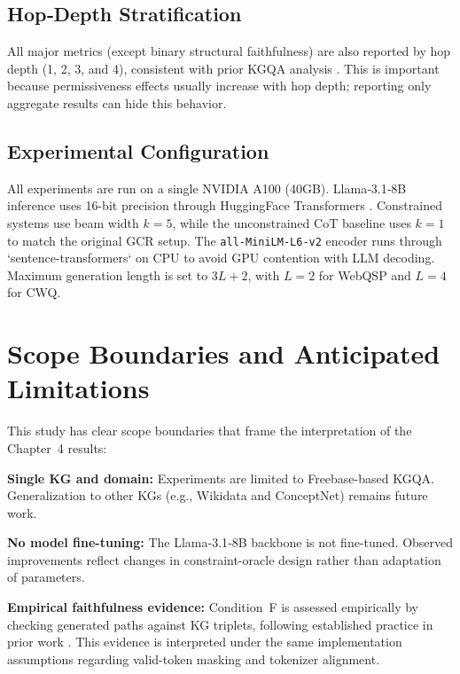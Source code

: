 \subsection{Hop‑Depth Stratification}

All major metrics (except binary structural faithfulness) are also reported by hop depth (1, 2, 3, and 4), consistent with prior KGQA analysis \citep{lan2022survey}. This is important because permissiveness effects usually increase with hop depth; reporting only aggregate results can hide this behavior.

\subsection{Experimental Configuration}

All experiments are run on a single NVIDIA A100 (40GB). Llama‑3.1‑8B inference uses 16-bit precision through HuggingFace Transformers \citep{wolf2020transformers}. Constrained systems use beam width $k=5$, while the unconstrained CoT baseline uses $k=1$ to match the original GCR setup. The \texttt{all-MiniLM-L6-v2} encoder runs through `sentence-transformers` \citep{reimers2019sbert} on CPU to avoid GPU contention with LLM decoding. Maximum generation length is set to $3L+2$, with $L=2$ for WebQSP and $L=4$ for CWQ.

\section{Scope Boundaries and Anticipated Limitations}
\label{sec:ch3limitations}

This study has clear scope boundaries that frame the interpretation of the Chapter~4 results:

\textbf{Single KG and domain:} Experiments are limited to Freebase-based KGQA. Generalization to other KGs (e.g., Wikidata and ConceptNet) remains future work.

\textbf{No model fine-tuning:} The Llama‑3.1‑8B backbone is not fine-tuned. Observed improvements reflect changes in constraint-oracle design rather than adaptation of parameters.

\textbf{Empirical faithfulness evidence:} Condition~F is assessed empirically by checking generated paths against KG triplets, following established practice in prior work \citep{luo2025-graph-constrained-reasoning, li2024-decoding-on-graphs}. This evidence is interpreted under the same implementation assumptions regarding valid-token masking and tokenizer alignment.

